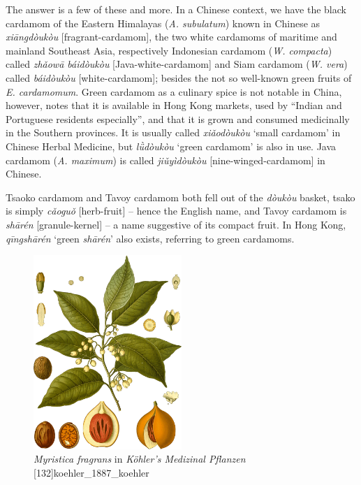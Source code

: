 \documentclass[12pt]{article}
\newcommand{\tc}[1]{\traditionalchinesefont{#1}\rmfamily}
\begin{document}

The answer is a few of these and more. In a Chinese context, we have the black cardamom of the Eastern Himalayas (\textit{A. subulatum}) known in Chinese as \textit{xiāngdòukòu} [fragrant-cardamom], the two white cardamoms of maritime and mainland Southeast Asia, respectively Indonesian cardamom (\textit{W. compacta}) called \textit{zhǎowā
báidòukòu} [Java-white-cardamom] and Siam cardamom (\textit{W. vera}) called \textit{báidòukòu} [white-cardamom]; besides the not so well-known green fruits of \textit{E. cardamomum}. Green cardamom as a culinary spice is not notable in China, however, \textcite{hu_2005_food} notes that it is available in Hong Kong markets, used by ``Indian and Portuguese residents especially'', and that it is grown and consumed medicinally in the Southern provinces. It is usually called \textit{xiǎodòukòu} `small cardamom' in Chinese Herbal Medicine, but \textit{lǜdòukòu} `green cardamom' is also in use. Java cardamom (\textit{A. maximum}) is called \textit{jiǔyìdòukòu} [nine-winged-cardamom] in Chinese. 

Tsaoko cardamom and Tavoy cardamom both fell out of the \textit{dòukòu} basket, tsako is simply \textit{cǎoguǒ} [herb-fruit] -- hence the English name, and Tavoy cardamom is \textit{shārén} [granule-kernel] -- a name suggestive of its compact fruit. In Hong Kong, \tc{青砂仁} \textit{qīngshā​rén} `green \textit{shārén}' also exists, referring to green cardamoms.




\begin{figure}
    \centering
    \includegraphics[width=0.5\textwidth]{imgs/nutmeg.png}
    \caption{\textit{Myristica fragrans} in \textit{Köhler's Medizinal Pflanzen} [132]{koehler_1887_koehler}}
    \label{fig:nutmeg}
\end{figure}
\end{document}
